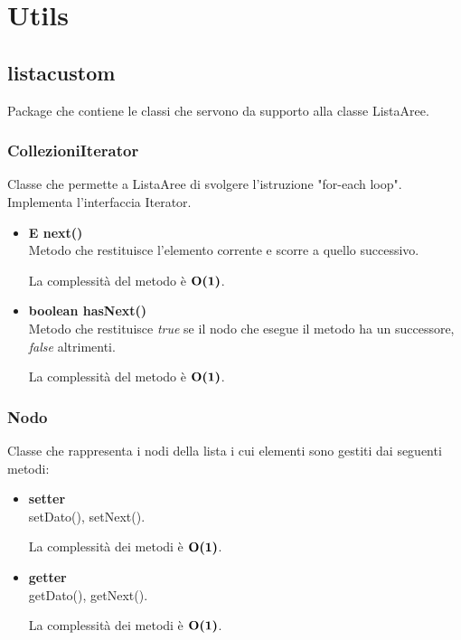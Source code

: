 \documentclass[a4paper, 12pt]{scrreprt}
\begin{document}
		\section{Utils}
			\subsection{listacustom}
			Package che contiene le classi che servono da supporto alla classe ListaAree.
				\subsubsection{CollezioniIterator}
				Classe che permette a ListaAree di svolgere l'istruzione "for-each loop". Implementa l'interfaccia Iterator.
				\begin{itemize}
					\item\textbf{E next()}
					\\Metodo che restituisce l'elemento corrente e scorre a quello successivo.
					
					La complessit\`a del metodo \`e $\mathbf{O}\textbf{(1)}$.
					
					\item\textbf{boolean hasNext()}
					\\Metodo che restituisce \textit{true} se il nodo che esegue il metodo ha un successore, \textit{false} altrimenti.
					
					La complessit\`a del metodo \`e $\mathbf{O}\textbf{(1)}$.
					
				\end{itemize}

				\subsubsection{Nodo}
				Classe che rappresenta i nodi della lista i cui elementi sono gestiti dai seguenti metodi:\\
				\begin{itemize}
					\item\textbf{setter}
					\\setDato(), setNext().
					
					La complessit\`a dei metodi \`e $\mathbf{O}\textbf{(1)}$.
					
					\item\textbf{getter}
					\\getDato(), getNext().
					
					La complessit\`a dei metodi \`e $\mathbf{O}\textbf{(1)}$.
					
				\end{itemize}
\end{document}

